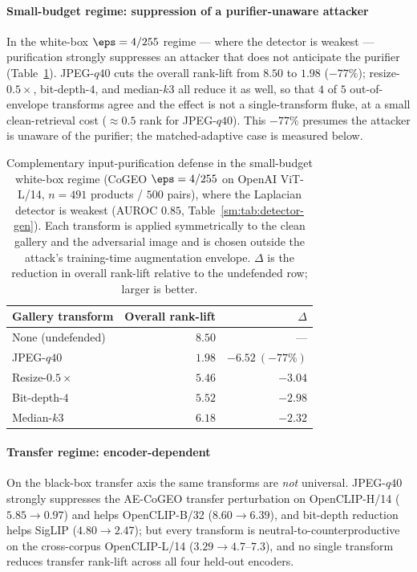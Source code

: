 \paragraph{Small-budget regime: suppression of a purifier-unaware attacker} In the white-box $\eps = 4/255$ regime --- where the detector is weakest --- purification strongly suppresses an attacker that does not anticipate the purifier (Table~\ref{sm:tab:purify}). JPEG-$q40$ cuts the overall rank-lift from $8.50$ to $1.98$ ($-77\%$); resize-$0.5\times$, bit-depth-$4$, and median-$k3$ all reduce it as well, so that $4$ of $5$ out-of-envelope transforms agree and the effect is not a single-transform fluke, at a small clean-retrieval cost ($\approx 0.5$ rank for JPEG-$q40$). This $-77\%$ presumes the attacker is unaware of the purifier; the matched-adaptive case is measured below.

\begin{table}[t]
\centering
\caption{Complementary input-purification defense in the small-budget white-box regime (CoGEO $\eps = 4/255$ on OpenAI ViT-L/14, $n = 491$ products / $500$ pairs), where the Laplacian detector is weakest (AUROC $0.85$, Table~\ref{sm:tab:detector-gen}). Each transform is applied symmetrically to the clean gallery and the adversarial image and is chosen outside the attack's training-time augmentation envelope. $\Delta$ is the reduction in overall rank-lift relative to the undefended row; larger is better.}
\label{sm:tab:purify}
\small
\setlength{\tabcolsep}{6pt}
\begin{tabular}{lrr}
\toprule
Gallery transform & Overall rank-lift & $\Delta$ \\
\midrule
None (undefended)  & $8.50$ & --- \\
JPEG-$q40$         & $\mathbf{1.98}$ & $-6.52\ (-77\%)$ \\
Resize-$0.5\times$ & $5.46$ & $-3.04$ \\
Bit-depth-$4$      & $5.52$ & $-2.98$ \\
Median-$k3$        & $6.18$ & $-2.32$ \\
\bottomrule
\end{tabular}
\end{table}

\paragraph{Transfer regime: encoder-dependent} On the black-box transfer axis the same transforms are \emph{not} universal. JPEG-$q40$ strongly suppresses the AE-CoGEO transfer perturbation on OpenCLIP-H/14 ($5.85 \to 0.97$) and helps OpenCLIP-B/32 ($8.60 \to 6.39$), and bit-depth reduction helps SigLIP ($4.80 \to 2.47$); but every transform is neutral-to-counterproductive on the cross-corpus OpenCLIP-L/14 ($3.29 \to 4.7$--$7.3$), and no single transform reduces transfer rank-lift across all four held-out encoders.

